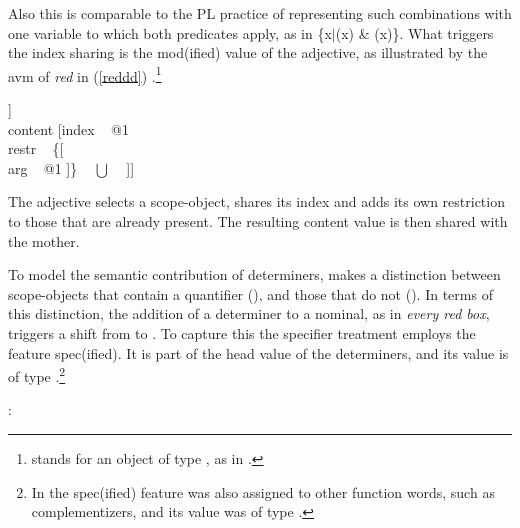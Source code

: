 \documentclass[output=paper]{langsci/langscibook}
\begin{document}
\noindent
Also this is comparable to the PL practice of representing such 
combinations with one variable to which both predicates apply, as in 
\{x$|$(x) \& (x)\}. What triggers the index sharing is 
the {\sc mod(ified)} value of the adjective, as illustrated by the {\sc avm} of 
\emph{red} in (\ref{reddd}) \citep[55]{ps2}.\footnote{\avmbox{$\Sigma$} 
stands for an object of type , as in \citet{GS00}.} 

\begin{exe} 
\ex\label{reddd}
\begin{avm}
[cat|head [\type{adjective}                               \\
           mod|loc|content [\type{scope-obj}            \\
                            index ~ @1                   \\
                            restr ~ \avmbox{$\Sigma$} ]] \\
 content [index ~ @1                                     \\
          restr ~ \{[                         \\
                     arg ~ @1 ]\} ~ $\bigcup$ ~ \avmbox{$\Sigma$} ]]
\end{avm}
\end{exe}

\noindent
The adjective selects a scope-object, shares its index and adds its own 
restriction to those that are already present. The resulting {\sc content} 
value is then shared with the mother.

To model the semantic contribution of determiners, \citet{GS00} 
makes a distinction between scope-objects that contain a quantifier 
(), and those that do not (). 
In terms of this distinction, the 
addition of a determiner to a nominal, as in \emph{every red box}, 
triggers a shift from  to . 
To capture this the specifier treatment employs the feature {\sc spec(ified)}. 
It is part of the {\sc head} value of the determiners, and its value is of type 
.\footnote{In \citet[45]{ps2} the {\sc spec(ified)}
feature was also assigned to other function words, such as complementizers, 
and its value was of type .}   

\begin{exe} 
\ex   {}: \begin{avm}  \end{avm}  
\end{exe} 
\end{document}
